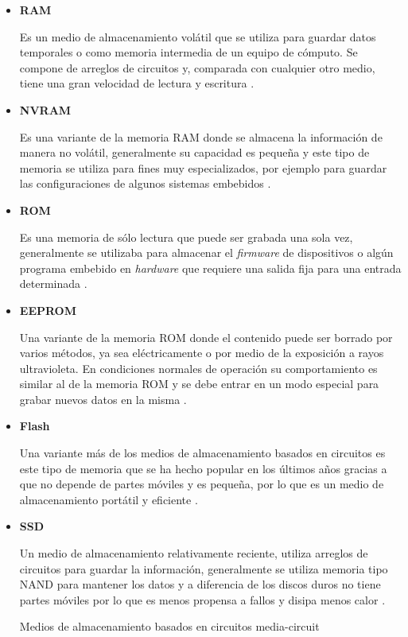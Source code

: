 \begin{itemize}

  \item \textbf{RAM}

Es un medio de almacenamiento vol\'{a}til que se utiliza para guardar datos temporales o como memoria intermedia de un equipo de c\'{o}mputo. Se compone de arreglos de circuitos y, comparada con cualquier otro medio, tiene una gran velocidad de lectura y escritura \cite{_rom_????}.

  \item \textbf{NVRAM}

Es una variante de la memoria \textsc{RAM} donde se almacena la informaci\'{o}n de manera no vol\'{a}til, generalmente su capacidad es peque\~{n}a y este tipo de memoria se utiliza para fines muy especializados, por ejemplo para guardar las configuraciones de algunos sistemas embebidos \cite{veenstra_random_1986}.

  \item \textbf{ROM}

Es una memoria de s\'{o}lo lectura que puede ser grabada una sola vez, generalmente se utilizaba para almacenar el \emph{\gls{firmware}} de dispositivos o alg\'{u}n programa embebido en \emph{\gls{hardware}} que requiere una salida fija para una entrada determinada \cite{_rom_????}.

  \item \textbf{EEPROM}

Una variante de la memoria \textsc{ROM} donde el contenido puede ser borrado por varios m\'{e}todos, ya sea el\'{e}ctricamente o por medio de la exposici\'{o}n a rayos ultravioleta. En condiciones normales de operaci\'{o}n su comportamiento es similar al de la memoria \textsc{ROM} y se debe entrar en un modo especial para grabar nuevos datos en la misma \cite{_rom_????-1}.

  \item \textbf{Flash}

Una variante m\'{a}s de los medios de almacenamiento basados en circuitos es este tipo de memoria que se ha hecho popular en los \'{u}ltimos a\~{n}os gracias a que no depende de partes m\'{o}viles y es peque\~{n}a, por lo que es un medio de almacenamiento port\'{a}til y eficiente \cite{_flashmemguide.pdf_????}.

  \item \textbf{SSD}

Un medio de almacenamiento relativamente reciente, utiliza arreglos de circuitos para guardar la informaci\'{o}n, generalmente se utiliza memoria tipo \textsc{NAND} para mantener los datos y a diferencia de los discos duros no tiene partes m\'{o}viles por lo que es menos propensa a fallos y disipa menos calor \cite{_ssd-faq-us.pdf_????}.

\diagramblock
{Medios de almacenamiento basados en circuitos}
{media-circuit}
{
 {
  
 }
}

\end{itemize}

